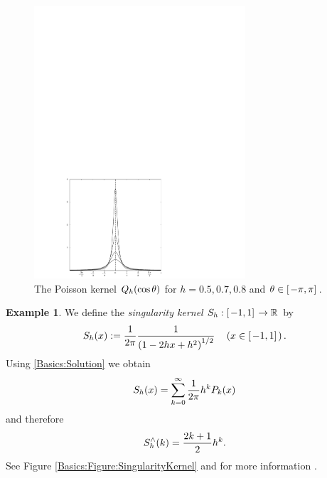 \documentclass[11pt,a4paper,twoside,bibtotoc]{scrartcl}
\theoremstyle{plain}
\theoremstyle{definition}
\newtheorem{example}[theorem]{Example}
\theoremstyle{remark}
\numberwithin{equation}{section}
\numberwithin{table}{section}
\numberwithin{figure}{section}
\begin{document}
\begin{figure}[tbp]
  \centering
  \includegraphics[width=0.7\textwidth]{images/poisson}
  \caption{The Poisson kernel $Q_{h}{\hspace{-0.4ex}}\left(\cos\theta\right)$ for $h = 0.5,0.7,0.8$ and $\theta \in \left[\left.-\pi,\pi\right]\right.$.}
  \label{Basics:Figure:PoissonKernel}
\end{figure}


\begin{example}
  We define the \emph{singularity kernel} $S_{h}:\left[\left.-1,1\right]\right. \rightarrow \mathbb{R}$ by
  \[
    S_{h}{\hspace{-0.4ex}}\left(x\right) := \frac{1}{2\pi} \frac{1}{\left(1-2hx+h^2\right)^{1/2}}  \quad \left(x \in \left[\left.-1,1\right]\right.\right).
  \]
  Using \eqref{Basics:Solution} we obtain
  \[
    S_{h}{\hspace{-0.4ex}}\left(x\right) = \sum_{k = 0}^{\infty} \frac{1}{2\pi} h^k P_k{\hspace{-0.4ex}}\left(x\right)
  \]
  and therefore
  \[
    S_{h}^{\wedge}{\hspace{-0.4ex}}\left(k\right) = \frac{2k+1}{2} h^k.
  \]
  See Figure \ref{Basics:Figure:SingularityKernel} and for more information \cite[pp. 112]{frgesc}.
\end{example}
\end{document}
